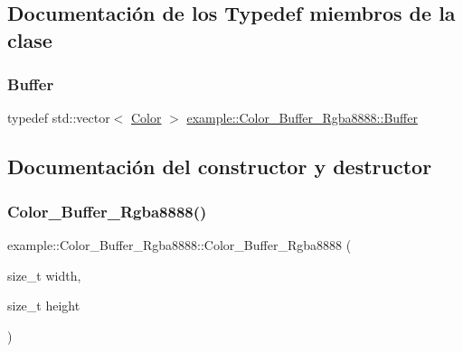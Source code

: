 \subsection{Documentación de los \textquotesingle{}Typedef\textquotesingle{} miembros de la clase}
\mbox{\label{classexample_1_1_color___buffer___rgba8888_ac6bfcddbbeeb02961b8724d9f5e10033}} 
\subsubsection{\texorpdfstring{Buffer}{Buffer}}
{\footnotesize\ttfamily typedef std\+::vector$<$ \mbox{\hyperlink{structexample_1_1_color___buffer___rgba8888_1_1_color}{Color}} $>$ \mbox{\hyperlink{classexample_1_1_color___buffer___rgba8888_ac6bfcddbbeeb02961b8724d9f5e10033}{example\+::\+Color\+\_\+\+Buffer\+\_\+\+Rgba8888\+::\+Buffer}}}



\subsection{Documentación del constructor y destructor}
\mbox{\label{classexample_1_1_color___buffer___rgba8888_aa5397ac3ceb62d95d0f4773205d98177}} 
\subsubsection{\texorpdfstring{Color\_Buffer\_Rgba8888()}{Color\_Buffer\_Rgba8888()}}
{\footnotesize\ttfamily example\+::\+Color\+\_\+\+Buffer\+\_\+\+Rgba8888\+::\+Color\+\_\+\+Buffer\+\_\+\+Rgba8888 (\begin{DoxyParamCaption}\item[{size\+\_\+t}]{width,  }\item[{size\+\_\+t}]{height }\end{DoxyParamCaption})\hspace{0.3cm}{\ttfamily [inline]}}



